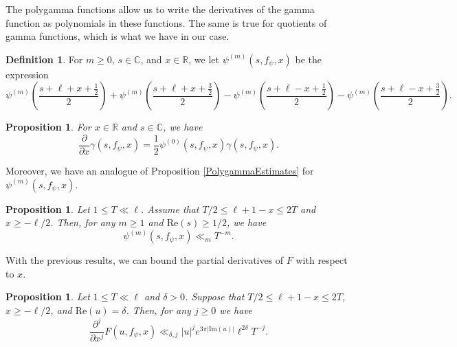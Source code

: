 \documentclass[11pt]{amsart}
\newcommand{\R}{\mathbb{R}}
\newcommand{\C}{\mathbb{C}}
\newtheorem{proposition}[theorem]{Proposition}
\theoremstyle{definition}
\newtheorem{definition}[theorem]{Definition}
\theoremstyle{remark}
\begin{document}
The polygamma functions allow us to write the derivatives of the gamma function as polynomials in these functions. The same is true for quotients of gamma functions, which is what we have in our case.

\begin{definition}
For $m\geq 0$, $s\in \C$, and $x\in \R$, we let $\psi^{(m)}(s,f_{\psi},x)$ be the expression $$\psi^{(m)}\left( \frac{s+\ell+x+\frac{1}{2}}{2} \right) +\psi^{(m)}\left( \frac{s+\ell+x+\frac{3}{2}}{2} \right) -\psi^{(m)}\left( \frac{s+\ell-x+\frac{1}{2}}{2} \right) -\psi^{(m)}\left( \frac{s+\ell-x+\frac{3}{2}}{2} \right).$$
\end{definition}

\begin{proposition}\label{Derivativegamma}
For $x\in \R$ and $s\in \C$, we have $$ \frac{\partial}{\partial x} \gamma(s,f_{\psi},x) = \frac{1}{2} \psi^{(0)}(s,f_{\psi},x) \gamma(s,f_{\psi},x).$$
\end{proposition}

Moreover, we have an analogue of Proposition \ref{PolygammaEstimates} for $\psi^{(m)}(s,f_{\psi},x)$.

\begin{proposition}\label{ModifiedPolygammaEstimates}
Let $1\leq T \ll \ell$. Assume that $T/2 \leq \ell+1-x \leq 2T$ and $x\geq -\ell/2$. Then, for any $m\geq 1$ and $\mathrm{Re}(s)\geq 1/2$, we have $$ \psi^{(m)}(s,f_{\psi},x) \ll_{m} T^{-m}.$$
\end{proposition}

With the previous results, we can bound the partial derivatives of $F$ with respect to $x$.

\begin{proposition}\label{DerivativesF}
Let $1\leq T \ll \ell$ and $\delta >0$. Suppose that $T/2 \leq \ell+1-x \leq 2T$,  $x\geq -\ell/2$, and $\mathrm{Re}(u)=\delta$. Then, for any $j\geq 0$ we have $$ \frac{\partial^j}{\partial x^j} F(u,f_{\psi},x) \ll_{\delta, j} |u|^{j} e^{3\pi |\mathrm{Im}(u)|} \ell^{2\delta} T^{-j}.$$
\end{proposition}
\end{document}
